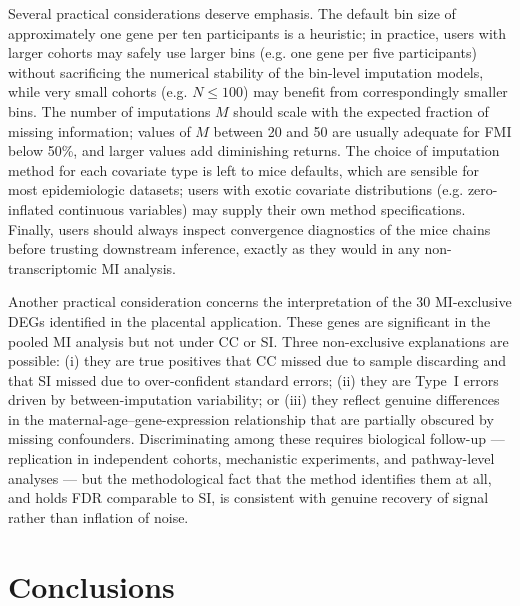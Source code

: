 \documentclass[11pt]{article}
\begin{document}
Several practical considerations deserve emphasis. The default bin size of approximately one gene per ten participants is a heuristic; in practice, users with larger cohorts may safely use larger bins (e.g. one gene per five participants) without sacrificing the numerical stability of the bin-level imputation models, while very small cohorts (e.g. $N \leq 100$) may benefit from correspondingly smaller bins. The number of imputations $M$ should scale with the expected fraction of missing information; values of $M$ between 20 and 50 are usually adequate for FMI below 50\%, and larger values add diminishing returns. The choice of imputation method for each covariate type is left to mice defaults, which are sensible for most epidemiologic datasets; users with exotic covariate distributions (e.g. zero-inflated continuous variables) may supply their own method specifications. Finally, users should always inspect convergence diagnostics of the mice chains before trusting downstream inference, exactly as they would in any non-transcriptomic MI analysis.

Another practical consideration concerns the interpretation of the 30 MI-exclusive DEGs identified in the placental application. These genes are significant in the pooled MI analysis but not under CC or SI. Three non-exclusive explanations are possible: (i) they are true positives that CC missed due to sample discarding and that SI missed due to over-confident standard errors; (ii) they are Type~I errors driven by between-imputation variability; or (iii) they reflect genuine differences in the maternal-age--gene-expression relationship that are partially obscured by missing confounders. Discriminating among these requires biological follow-up --- replication in independent cohorts, mechanistic experiments, and pathway-level analyses --- but the methodological fact that the method identifies them at all, and holds FDR comparable to SI, is consistent with genuine recovery of signal rather than inflation of noise.

\section{Conclusions}
\end{document}
